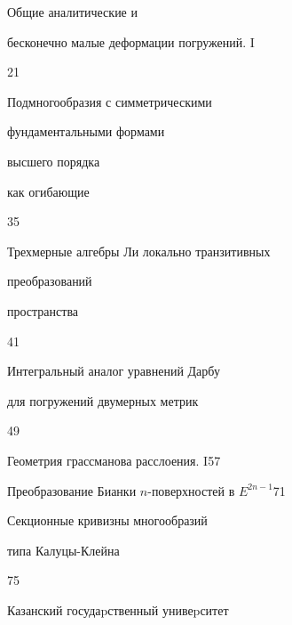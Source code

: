 

{Общие аналитические и


бесконечно малые деформации погружений. I}{21}




{Подмногообразия с симметрическими


фундаментальными формами\newline


высшего порядка


как огибающие}{35}




{Трехмерные алгебры Ли локально транзитивных


преобразований\newline


пространства}{41}




{Интегральный аналог уравнений Дарбу


для погружений двумерных метрик}{49}




{Геометрия грассманова расслоения. I}{57}




{Преобразование Бианки $n$-поверхностей в $E^{2n-1}$}{71}




{Секционные кривизны многообразий


типа Калуцы-Клейна}{75}








\vfill


\noindent\raisebox{2pt}{\copyright} Казанский госудаpственный унивеpситет





